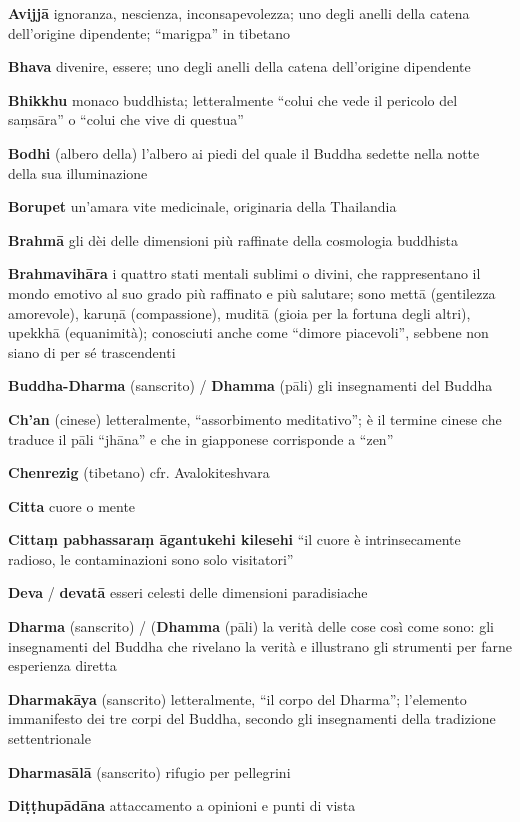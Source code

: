 \textbf{Avijjā }ignoranza, nescienza, inconsapevolezza; uno degli anelli della catena dell'origine dipendente; ``marigpa'' in tibetano

\textbf{Bhava }divenire, essere; uno degli anelli della catena dell'origine dipendente

\textbf{Bhikkhu }monaco buddhista; letteralmente ``colui che vede il pericolo del saṃsāra'' o ``colui che vive di questua''

\textbf{Bodhi }(albero della) l'albero ai piedi del quale il Buddha sedette nella notte della sua illuminazione

\textbf{Borupet }un'amara vite medicinale, originaria della Thailandia

\textbf{Brahmā }gli dèi delle dimensioni più raffinate della cosmologia buddhista

\textbf{Brahmavihāra }i quattro stati mentali sublimi o divini, che rappresentano il mondo emotivo al suo grado più raffinato e più salutare; sono mettā (gentilezza amorevole), karuṇā (compassione), muditā (gioia per la fortuna degli altri), upekkhā (equanimità); conosciuti anche come ``dimore piacevoli'', sebbene non siano di per sé trascendenti

\textbf{Buddha-Dharma }(sanscrito) / \textbf{Dhamma} (pāli) gli insegnamenti del Buddha

\textbf{Ch'an }(cinese) letteralmente, ``assorbimento meditativo''; è il termine cinese che traduce il pāli ``jhāna'' e che in giapponese corrisponde a ``zen''

\textbf{Chenrezig }(tibetano) cfr. Avalokiteshvara

\textbf{Citta }cuore o mente

\textbf{Cittaṃ pabhassaraṃ āgantukehi kilesehi }``il cuore è intrinsecamente radioso, le contaminazioni sono solo visitatori''

\textbf{Deva} / \textbf{devatā }esseri celesti delle dimensioni paradisiache

\textbf{Dharma} (sanscrito) / (\textbf{Dhamma} (pāli) la verità delle cose così come sono: gli insegnamenti del Buddha che rivelano la verità e illustrano gli strumenti per farne esperienza diretta

\textbf{Dharmakāya} (sanscrito) letteralmente, ``il corpo del Dharma''; l'elemento immanifesto dei tre corpi del Buddha, secondo gli insegnamenti della tradizione settentrionale

\textbf{Dharmasālā} (sanscrito) rifugio per pellegrini

\textbf{Di}\textbf{ṭṭ}\textbf{hupādāna }attaccamento a opinioni e punti di vista

